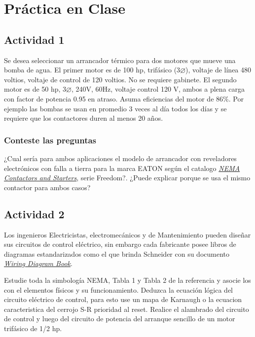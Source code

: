 \section{Práctica en Clase}

\subsection{Actividad 1}

 Se desea seleccionar un arrancador térmico para dos motores que mueve una bomba de agua. El primer motor es de 100 hp, trifásico (3$\varnothing$), voltaje de línea 480 voltios, voltaje de control de 120 voltios. No se requiere gabinete. El segundo motor es de 50 hp, 3$\varnothing$, 240V, 60Hz, voltaje control 120 V, ambos a plena carga con factor de potencia 0.95 en atraso. Asuma eficiencias del motor de 86\%. Por ejemplo las bombas se usan en promedio 3 veces al día todos los días y se requiere que los contactores duren al menos 20 años. 
 
\subsubsection{Conteste las preguntas}

¿Cual sería para ambos aplicaciones el modelo de arrancador con reveladores electrónicos con falla a tierra para la marca EATON según el catalogo \href{https://www.eaton.com/content/dam/eaton/products/industrialcontrols-drives-automation-sensors/nema-contactors-and-starters-v5-t2-ca08100006e.pdf}{\textit{NEMA Contactors and Starters}}, serie Freedom?. ¿Puede explicar porque se usa el mismo contactor para ambos casos?


\subsection{Actividad 2}
  Los ingenieros Electricistas, electromecánicos y de Mantenimiento pueden diseñar sus circuitos de control eléctrico, sin embargo cada fabricante posee libros de diagramas estandarizados como el que brinda  Schneider con su documento \href{https://download.schneider-electric.com/files?p_enDocType=Catalog&p_File_Name=0140CT9201.pdf&p_Doc_Ref=0140CT9201&_ga=2.160182845.1491407618.1677858387-1733391740.1677858387}{\textit{Wiring Diagram Book}}\cite{Scheneider2}.
 
 Estudie toda la simbología NEMA, Tabla 1 y Tabla 2 de la referencia \cite{Scheneider2} y asocie los con el elementos físicos y su funcionamiento.
 Deduzca la ecuación lógica del circuito eléctrico de control, para esto use un mapa de Karnaugh o la ecuacion caracteristica del cerrojo S-R prioridad al reset.
 Realice el alambrado del circuito de control y luego del circuito de potencia del arranque sencillo de un motor trifásico de 1/2 hp.

